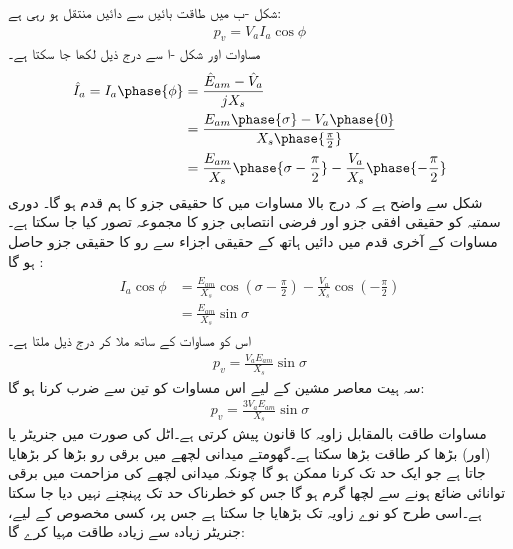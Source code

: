  شکل -ب میں طاقت  بائیں سے دائیں منتقل ہو رہی ہے:
\begin{align}\label{مساوات_معاصر_طاقت_کی_منتقلی_الف}
p_v=V_a I_a \cos \phi
\end{align}
مساوات  اور شکل -ا  سے درج ذیل لکھا جا سکتا ہے۔
\begin{gather}
\begin{aligned}\label{مساوات_معاصر_رو_بالمقابل_دو_دباو}
\hat{I}_a=I_a \phase{\phi}&=\frac{\hat{E}_{am}-\hat{V}_a}{j X_s}\\
&=\frac{E_{am} \phase{\sigma} -V_a \phase {0}}{X_s \phase{\frac{\pi}{2}}}\\
&=\frac{E_{am}}{X_s} \phase{\sigma-\frac{\pi}{2}} -\frac{V_a}{X_s} \phase {-\frac{\pi}{2}}
\end{aligned}
\end{gather}
شکل  سے واضح ہے کہ درج بالا مساوات میں  کا حقیقی جزو   کا ہم قدم ہو گا۔   دوری سمتیہ  کو  حقیقی افقی جزو  اور فرضی  انتصابی جزو  کا مجموعہ تصور کیا جا سکتا ہے۔ مساوات  کے آخری قدم میں دائیں ہاتھ کے حقیقی اجزاء سے رو کا حقیقی جزو حاصل ہو گا :
\begin{gather}
\begin{aligned}
I_a \cos \phi&=\frac{E_{am}}{X_s} \cos \left(\sigma -\frac{\pi}{2} \right)-\frac{V_a}{X_s} \cos \left(-\frac{\pi}{2} \right)\\
&=\frac{E_{am}}{X_s} \sin \sigma
\end{aligned}
\end{gather}
اس کو مساوات   کے ساتھ ملا کر درج ذیل ملتا ہے۔
\begin{align}\label{مساوات_معاصر_سائن_خصوصیات}
p_v=\frac{V_a E_{am}}{X_s} \sin \sigma
\end{align}
سہ ہیت معاصر مشین کے لیے اس مساوات کو تین سے ضرب کرنا ہو گا:
\begin{align}\label{مساوات_معاصر_طاقت_بالمقابل_زاویہ}
p_v=\frac{3 V_a E_{am}}{X_s} \sin \sigma
\end{align}
مساوات  طاقت بالمقابل زاویہ کا قانون پیش کرتی ہے۔اٹل  کی صورت میں جنریٹر  یا (اور)  بڑھا کر طاقت بڑھا سکتا ہے۔گھومتے میدانی لچھے میں برقی رو بڑھا کر   بڑھایا جاتا ہے جو ایک حد تک کرنا ممکن ہو گا چونکہ میدانی  لچھے کی مزاحمت میں برقی توانائی ضائع ہونے سے لچھا گرم ہو گا جس کو خطرناک حد تک پہنچنے نہیں دیا جا سکتا ہے۔اسی طرح   کو نوے زاویہ تک بڑھایا  جا سکتا ہے جس پر، کسی مخصوص  کے لیے، جنریٹر زیادہ سے زیادہ طاقت مہیا کرے گا:
